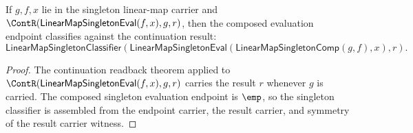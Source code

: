 \begin{theorem}
\label{thm:linearmap-singleton-eval-comp-continuation-classifier}
If $g,f,x$ lie in the singleton linear-map carrier and
$\ContR(\mathsf{LinearMapSingletonEval}(f,x),g,r)$, then the composed
evaluation endpoint classifies against the continuation result:
$$
\mathsf{LinearMapSingletonClassifier}
(\mathsf{LinearMapSingletonEval}(\mathsf{LinearMapSingletonComp}(g,f),x),r).
$$
\end{theorem}
\begin{proof}
The continuation readback theorem applied to
$\ContR(\mathsf{LinearMapSingletonEval}(f,x),g,r)$ carries the result $r$
whenever $g$ is carried. The composed singleton evaluation endpoint is
$\emp$, so the singleton classifier is assembled from the endpoint carrier,
the result carrier, and symmetry of the result carrier witness.
\end{proof}

